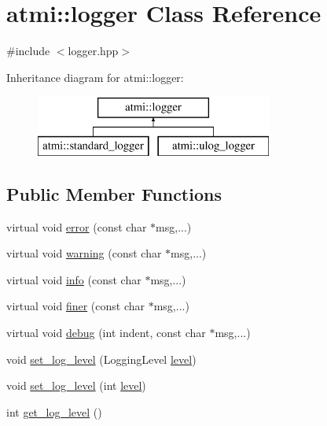 \hypertarget{classatmi_1_1logger}{\section{atmi\+:\+:logger Class Reference}
\label{classatmi_1_1logger}
}


{\ttfamily \#include $<$logger.\+hpp$>$}

Inheritance diagram for atmi\+:\+:logger\+:\begin{figure}[H]
\begin{center}
\leavevmode
\includegraphics[height=2.000000cm]{classatmi_1_1logger}
\end{center}
\end{figure}
\subsection*{Public Member Functions}
\begin{DoxyCompactItemize}
\item 
virtual void \hyperlink{classatmi_1_1logger_a15a9a69cc9031f26e38cf8594ed2377a}{error} (const char $\ast$msg,...)
\item 
virtual void \hyperlink{classatmi_1_1logger_a962acd49cbba69ec175b25321e2198be}{warning} (const char $\ast$msg,...)
\item 
virtual void \hyperlink{classatmi_1_1logger_a3b3a3ab94d7808bddf99c21d0307fa6d}{info} (const char $\ast$msg,...)
\item 
virtual void \hyperlink{classatmi_1_1logger_a6862a08d685fce50791530fc0c011841}{finer} (const char $\ast$msg,...)
\item 
virtual void \hyperlink{classatmi_1_1logger_a6ccf708a9c54be81433f7164a5bf33a4}{debug} (int indent, const char $\ast$msg,...)
\item 
void \hyperlink{classatmi_1_1logger_aa8c3743cb153dd802e8e556d020b65cb}{set\+\_\+log\+\_\+level} (Logging\+Level \hyperlink{classatmi_1_1logger_a70bf3a05b911b63d4548507fdea5dfbd}{level})
\item 
void \hyperlink{classatmi_1_1logger_a2da95e739145fb4aebeb4bb453c377ba}{set\+\_\+log\+\_\+level} (int \hyperlink{classatmi_1_1logger_a70bf3a05b911b63d4548507fdea5dfbd}{level})
\item 
int \hyperlink{classatmi_1_1logger_a52684cd4c56773570540c62cfdc5c6c8}{get\+\_\+log\+\_\+level} ()
\end{DoxyCompactItemize}
